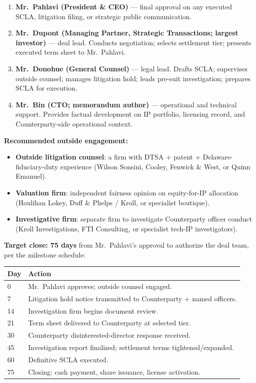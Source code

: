 \documentclass[11pt,letterpaper]{article}
\begin{document}
\begin{enumerate}[leftmargin=1.5em,itemsep=0.1em]
\item \textbf{Mr.\ Pahlavi (President \& CEO)} --- final approval
on any executed SCLA, litigation filing, or strategic public
communication.
\item \textbf{Mr.\ Dupont (Managing Partner, Strategic Transactions;
largest investor)} --- deal lead. Conducts negotiation; selects
settlement tier; presents executed term sheet to Mr.\ Pahlavi.
\item \textbf{Mr.\ Donohue (General Counsel)} --- legal lead.
Drafts SCLA; supervises outside counsel; manages litigation hold;
leads pre-suit investigation; prepares SCLA for execution.
\item \textbf{Mr.\ Bin (CTO; memorandum author)} --- operational and
technical support. Provides factual development on IP portfolio,
licensing record, and Counterparty-side operational context.
\end{enumerate}

\textbf{Recommended outside engagement:}

\begin{itemize}[leftmargin=1.5em,itemsep=0.1em]
\item \textbf{Outside litigation counsel}: a firm with DTSA + patent
+ Delaware-fiduciary-duty experience (Wilson Sonsini, Cooley, Fenwick
\& West, or Quinn Emanuel).
\item \textbf{Valuation firm}: independent fairness opinion on
equity-for-IP allocation (Houlihan Lokey, Duff \& Phelps / Kroll, or
specialist boutique).
\item \textbf{Investigative firm}: separate firm to investigate
Counterparty officer conduct (Kroll Investigations, FTI Consulting,
or specialist tech-IP investigators).
\end{itemize}

\textbf{Target close: 75 days} from Mr.\ Pahlavi's approval to
authorize the deal team, per the milestone schedule:

\begin{center}
\begin{tabular}{lp{10cm}}
\toprule
\textbf{Day} & \textbf{Action} \\
\midrule
0   & Mr.\ Pahlavi approves; outside counsel engaged. \\
7   & Litigation hold notice transmitted to Counterparty + named officers. \\
14  & Investigation firm begins document review. \\
21  & Term sheet delivered to Counterparty at selected tier. \\
30  & Counterparty disinterested-director response received. \\
45  & Investigation report finalized; settlement terms tightened/expanded. \\
60  & Definitive SCLA executed. \\
75  & Closing: cash payment, share issuance, license activation. \\
\bottomrule
\end{tabular}
\end{center}
\end{document}
